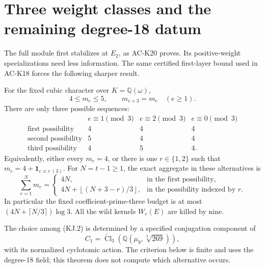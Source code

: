 \section{Three weight classes and the remaining degree-18 datum}
\label{sec:cubic-three-weights}

The full module first stabilizes at $E_2$, as AC-K20 proves.
Its positive-weight specializations need less information.
The same certified first-layer bound used in AC-K18
forces the following sharper result.

\begin{theorem}
\label{AC-K21}
For the fixed cubic character over $K=\mathbb Q(\omega)$,
\[
          4\leq m_e\leq5,
       \qquad m_{e+3}=m_e\quad(e\geq1).              \tag{KJ.1}
\]
There are only three possible sequences:
\[
 \begin{array}{c|ccc}
 &e\equiv1\pmod3&e\equiv2\pmod3&e\equiv0\pmod3\\\hline
 \text{first possibility}&4&4&4\\
 \text{second possibility}&5&4&4\\
 \text{third possibility}&4&5&4.
 \end{array}                                         \tag{KJ.2}
\]
Equivalently, either every $m_e=4$, or there is one
$r\in\{1,2\}$ such that $m_e=4+\mathbf1_{e\equiv r\ (3)}$.
For $N=t-1\geq1$, the exact aggregate in these alternatives is
\[
 \sum_{e=1}^Nm_e=
 \begin{cases}
 4N,&\text{in the first possibility},\\
 4N+\left\lfloor (N+3-r)/3\right\rfloor,
                  &\text{in the possibility indexed by }r.
 \end{cases}                                         \tag{KJ.3}
\]
In particular the fixed coefficient-prime-three budget is
at most $(4N+\lceil N/3\rceil)\log3$.
All the wild kernels $W_e(E)$ are killed by nine.

The choice among (KJ.2) is determined by a specified
conjugation component of
\[
 C_1=\widetilde{\operatorname{Cl}}_3
        (\mathbb Q(\mu_9,\sqrt[3]{269})),             \tag{KJ.4}
\]
with its normalized cyclotomic action.  The criterion below
is finite and uses the degree-18 field; this theorem does
not compute which alternative occurs.
\end{theorem}
